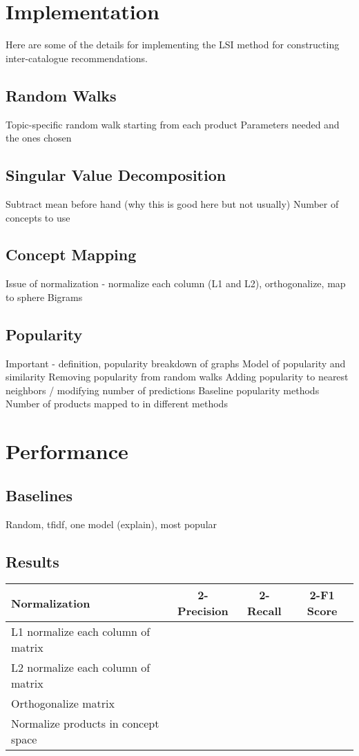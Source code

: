 \documentclass[11pt]{article}
\begin{document}
\section*{Implementation}
Here are some of the details for implementing the LSI method for constructing
inter-catalogue recommendations.

\subsection*{Random Walks}
Topic-specific random walk starting from each product
Parameters needed and the ones chosen

\subsection*{Singular Value Decomposition}
Subtract mean before hand (why this is good here but not usually)
Number of concepts to use

\subsection*{Concept Mapping}
Issue of normalization - normalize each column (L1 and L2), orthogonalize, map
to sphere
Bigrams

\subsection*{Popularity}
Important - definition, popularity breakdown of graphs
Model of popularity and similarity
Removing popularity from random walks
Adding popularity to nearest neighbors / modifying number of predictions
Baseline popularity methods
Number of products mapped to in different methods

\section*{Performance}
\subsection*{Baselines}
Random, tfidf, one model (explain), most popular

\subsection*{Results}
\begin{center}
\begin{tabular}{ | l | c | c | c |}
\hline
Normalization & 2-Precision & 2-Recall & 2-F1 Score \\ \hline\hline
L1 normalize each column of matrix &&&\\ \hline
L2 normalize each column of matrix &&&\\ \hline
Orthogonalize matrix &&&\\ \hline
Normalize products in concept space &&&\\ \hline
\end{tabular}
\end{center}
\end{document}

